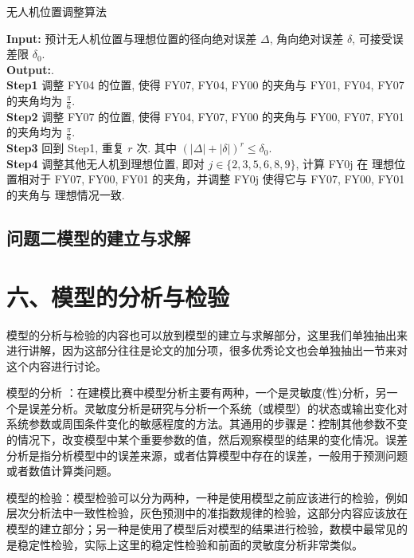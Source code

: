 \documentclass{my_paper}
\begin{document}
\begin{algorithm}[t]
    \caption{\small 无人机位置调整算法}
    \textbf{Input:} 预计无人机位置与理想位置的径向绝对误差 $\Delta$, 角向绝对误差 $\delta$, 可接受误差限 $\delta_0$.\\
    \textbf{Output:}. \\
    \textbf{Step1} 调整 FY04 的位置, 使得 FY07, FY04, FY00 的夹角与 FY01, FY04, FY07 的夹角均为 $\frac{\pi}{6}$.\\
    \textbf{Step2} 调整 FY07 的位置, 使得 FY04, FY07, FY00 的夹角与 FY00, FY07, FY01 的夹角均为 $\frac{\pi}{6}$.\\
    \textbf{Step3} 回到 Step1, 重复 $r$ 次. 其中 $(|\Delta|+|\delta|)^r\leq\delta_0$. \\
    \textbf{Step4} 调整其他无人机到理想位置, 即对 $j\in\{2,3,5,6,8,9\}$, 计算 FY0j 在
    理想位置相对于 FY07, FY00, FY01 的夹角，并调整 FY0j 使得它与 FY07, FY00, FY01 的夹角与
    理想情况一致.\\
\end{algorithm}

\subsection{问题二模型的建立与求解}



\section{六、模型的分析与检验}

模型的分析与检验的内容也可以放到模型的建立与求解部分，这里我们单独抽出来进行讲解，因为这部分往往是论文的加分项，很多优秀论文也会单独抽出一节来对这个内容进行讨论。

模型的分析 ：在建模比赛中模型分析主要有两种，一个是灵敏度(性)分析，另一个是误差分析。灵敏度分析是研究与分析一个系统（或模型）的状态或输出变化对系统参数或周围条件变化的敏感程度的方法。其通用的步骤是：控制其他参数不变的情况下，改变模型中某个重要参数的值，然后观察模型的结果的变化情况。误差分析是指分析模型中的误差来源，或者估算模型中存在的误差，一般用于预测问题或者数值计算类问题。

模型的检验：模型检验可以分为两种，一种是使用模型之前应该进行的检验，例如层次分析法中一致性检验，灰色预测中的准指数规律的检验，这部分内容应该放在模型的建立部分；另一种是使用了模型后对模型的结果进行检验，数模中最常见的是稳定性检验，实际上这里的稳定性检验和前面的灵敏度分析非常类似。
\end{document}
